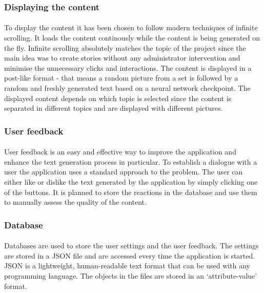 \documentclass[12pt]{report}
\begin{document}
\subsubsection*{Displaying the content}
\paragraph{}
To display the content it has been chosen to follow modern techniques of infinite scrolling. It loads
the content continously while the content is being generated on the fly. Infinite scrolling absolutely matches the 
topic of the project since the main idea was to create stories without any administrator intervention and 
minimise the unnecessary clicks and interactions. The content is displayed in a post-like format - that means 
a random picture from a set is followed by a random and freshly generated text based on a neural network checkpoint.
The displayed content depends on which topic is selected since the content is separated in different topics and
are displayed with different pictures.


\subsubsection*{User feedback}
\paragraph{}
User feedback is an easy and effective way to improve the application and enhance the text generation process in
particular. To establish a dialogue with a user the application uses a standard approach to the problem.
The user can either like or dislike the text generated by the application by simply clicking one of the buttons. 
It is planned to store the reactions in the database and use them to manually assess the quality of the content.

\subsubsection*{Database}
\paragraph{}
Databases are used to store the user settings and the user feedback. The settings are stored in a JSON file and are
accessed every time the application is started. JSON is a lightweight, human-readable text format that can be used with
any programming language. The objects in the files are stored in an `attribute-value' format. 
\end{document}
